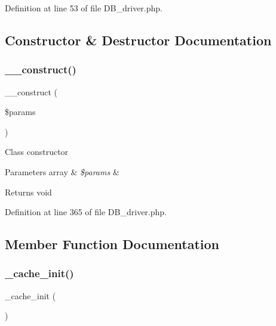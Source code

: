 Definition at line 53 of file D\+B\+\_\+driver.\+php.



\subsection{Constructor \& Destructor Documentation}
\mbox{\label{class_c_i___d_b__driver_a9162320adff1a1a4afd7f2372f753a3e}} 
\subsubsection{\texorpdfstring{\_\_construct()}{\_\_construct()}}
{\footnotesize\ttfamily \+\_\+\+\_\+construct (\begin{DoxyParamCaption}\item[{}]{\$params }\end{DoxyParamCaption})}

Class constructor


\begin{DoxyParams}[1]{Parameters}
array & {\em \$params} & \\
\hline
\end{DoxyParams}
\begin{DoxyReturn}{Returns}
void 
\end{DoxyReturn}


Definition at line 365 of file D\+B\+\_\+driver.\+php.



\subsection{Member Function Documentation}
\mbox{\label{class_c_i___d_b__driver_a3991c9b589034f12f6fed26d83ac47e4}} 
\subsubsection{\texorpdfstring{\_cache\_init()}{\_cache\_init()}}
{\footnotesize\ttfamily \+\_\+cache\+\_\+init (\begin{DoxyParamCaption}{ }\end{DoxyParamCaption})\hspace{0.3cm}{\ttfamily [protected]}}

